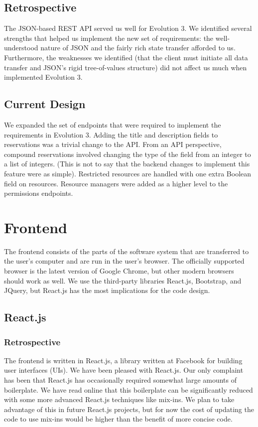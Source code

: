 \documentclass[12pt]{article}
\begin{document}
\subsection{Retrospective}
The JSON-based REST API served us well for Evolution 3. We identified several strengths that helped us implement the new set of requirements: the well-understood nature of JSON and the fairly rich state transfer afforded to us. Furthermore, the weaknesses we identified (that the client must initiate all data transfer and JSON's rigid tree-of-values structure) did not affect us much when implemented Evolution 3.

\subsection{Current Design}
We expanded the set of endpoints that were required to implement the requirements in Evolution 3. Adding the title and description fields to reservations was a trivial change to the API. From an API perspective, compound reservations involved changing the type of the field from an integer to a list of integers. (This is not to say that the backend changes to implement this feature were as simple). Restricted resources are handled with one extra Boolean field on resources. Resource managers were added as a higher level to the permissions endpoints.

\section{Frontend}
\label{sec:Frontend}
The frontend consists of the parts of the software system that are transferred to the user's computer and are run in the user's browser. The officially supported browser is the latest version of Google Chrome, but other modern browsers should work as well. We use the third-party libraries React.js, Bootstrap, and JQuery, but React.js has the most implications for the code design.

\subsection{React.js}
\subsubsection{Retrospective}
The frontend is written in React.js, a library written at Facebook for building user interfaces (UIs). We have been pleased with React.js. Our only complaint has been that React.js has occasionally required somewhat large amounts of boilerplate. We have read online that this boilerplate can be significantly reduced with some more advanced React.js techniques like mix-ins. We plan to take advantage of this in future React.js projects, but for now the cost of updating the code to use mix-ins would be higher than the benefit of more concise code.
\end{document}
